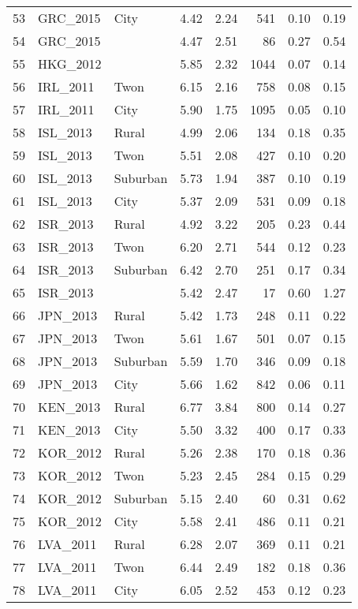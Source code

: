 \documentclass[12pt, titlepage]{article}
\begin{document}
\begin{longtable}[H]{rllrrrrr}
		53 & GRC\_2015 & City & 4.42 & 2.24 & 541 & 0.10 & 0.19 \\ 
		54 & GRC\_2015 &  & 4.47 & 2.51 &  86 & 0.27 & 0.54 \\ 
		55 & HKG\_2012 &  & 5.85 & 2.32 & 1044 & 0.07 & 0.14 \\ 
		56 & IRL\_2011 & Twon & 6.15 & 2.16 & 758 & 0.08 & 0.15 \\ 
		57 & IRL\_2011 & City & 5.90 & 1.75 & 1095 & 0.05 & 0.10 \\ 
		58 & ISL\_2013 & Rural & 4.99 & 2.06 & 134 & 0.18 & 0.35 \\ 
		59 & ISL\_2013 & Twon & 5.51 & 2.08 & 427 & 0.10 & 0.20 \\ 
		60 & ISL\_2013 & Suburban & 5.73 & 1.94 & 387 & 0.10 & 0.19 \\ 
		61 & ISL\_2013 & City & 5.37 & 2.09 & 531 & 0.09 & 0.18 \\ 
		62 & ISR\_2013 & Rural & 4.92 & 3.22 & 205 & 0.23 & 0.44 \\ 
		63 & ISR\_2013 & Twon & 6.20 & 2.71 & 544 & 0.12 & 0.23 \\ 
		64 & ISR\_2013 & Suburban & 6.42 & 2.70 & 251 & 0.17 & 0.34 \\ 
		65 & ISR\_2013 &  & 5.42 & 2.47 &  17 & 0.60 & 1.27 \\ 
		66 & JPN\_2013 & Rural & 5.42 & 1.73 & 248 & 0.11 & 0.22 \\ 
		67 & JPN\_2013 & Twon & 5.61 & 1.67 & 501 & 0.07 & 0.15 \\ 
		68 & JPN\_2013 & Suburban & 5.59 & 1.70 & 346 & 0.09 & 0.18 \\ 
		69 & JPN\_2013 & City & 5.66 & 1.62 & 842 & 0.06 & 0.11 \\ 
		70 & KEN\_2013 & Rural & 6.77 & 3.84 & 800 & 0.14 & 0.27 \\ 
		71 & KEN\_2013 & City & 5.50 & 3.32 & 400 & 0.17 & 0.33 \\ 
		72 & KOR\_2012 & Rural & 5.26 & 2.38 & 170 & 0.18 & 0.36 \\ 
		73 & KOR\_2012 & Twon & 5.23 & 2.45 & 284 & 0.15 & 0.29 \\ 
		74 & KOR\_2012 & Suburban & 5.15 & 2.40 &  60 & 0.31 & 0.62 \\ 
		75 & KOR\_2012 & City & 5.58 & 2.41 & 486 & 0.11 & 0.21 \\ 
		76 & LVA\_2011 & Rural & 6.28 & 2.07 & 369 & 0.11 & 0.21 \\ 
		77 & LVA\_2011 & Twon & 6.44 & 2.49 & 182 & 0.18 & 0.36 \\ 
		78 & LVA\_2011 & City & 6.05 & 2.52 & 453 & 0.12 & 0.23 \\ 

\end{longtable}
\end{document}

